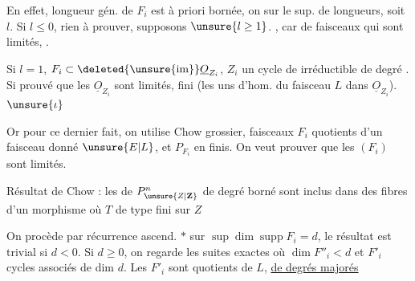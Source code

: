 En effet, longueur gén. de $F_i$ est à priori bornée, on  sur le sup. de  longueurs, soit $l$.
Si $l\leq0$, rien à prouver, supposons $\unsure{l\geq1}$.
  ,   car   de faisceaux qui sont limités,  .

Si $l=1$, $F_i\subset\deleted{\unsure{\operatorname{im}}}\underline{O}_{Z_i}$, $Z_i$ un cycle de  irréductible de degré . Si    prouvé que les $\underline{O}_{Z_i}$ sont limités,  fini (les uns  d'hom.  du faisceau $L$ dans $\underline{O}_{Z_i}$). $\unsure{\iota}$

Or pour ce dernier fait, on utilise Chow grossier,
faisceaux $F_i$ quotients d'un faisceau donné $\unsure{E|L}$, et  $P_{F_i}$ en  finis. On veut prouver que les $(F_i)$ sont limités. 

  Résultat de Chow : les  de $P^n_{\unsure{Z|\mathbf Z}}$ de  degré  borné sont inclus dans des fibres d'un
morphisme 
où $T$ de type fini sur $Z$

 On procède par récurrence ascend. $*$ sur $\sup\dim\operatorname{supp}F_i=d$, le résultat est trivial si $d<0$. Si $d\geq0$, on regarde les  suites exactes
 où $\dim F''_i<d$ et $F'_i$  cycles associés de dim $d$.
Les $F'_i$ sont quotients de $L$, \uline{de degrés majorés}

